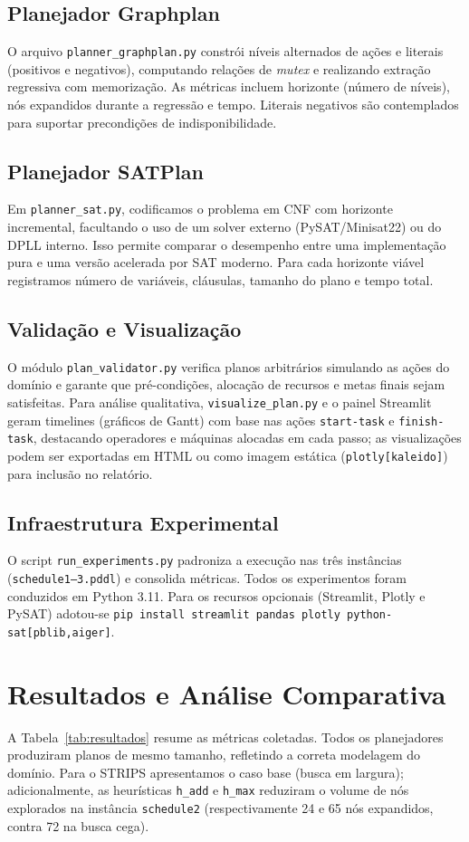 \documentclass[12pt]{article}
\begin{document}
\subsection{Planejador Graphplan}
O arquivo \texttt{planner\_graphplan.py} constrói níveis alternados de ações e literais (positivos e negativos), computando relações de \emph{mutex} e realizando extração regressiva com memorização. As métricas incluem horizonte (número de níveis), nós expandidos durante a regressão e tempo. Literais negativos são contemplados para suportar precondições de indisponibilidade.

\subsection{Planejador SATPlan}
Em \texttt{planner\_sat.py}, codificamos o problema em CNF com horizonte incremental, facultando o uso de um solver externo (PySAT/Minisat22) ou do DPLL interno. Isso permite comparar o desempenho entre uma implementação pura e uma versão acelerada por SAT moderno. Para cada horizonte viável registramos número de variáveis, cláusulas, tamanho do plano e tempo total.

\subsection{Validação e Visualização}
O módulo \texttt{plan\_validator.py} verifica planos arbitrários simulando as ações do domínio e garante que pré-condições, alocação de recursos e metas finais sejam satisfeitas. Para análise qualitativa, \texttt{visualize\_plan.py} e o painel Streamlit geram timelines (gráficos de Gantt) com base nas ações \texttt{start-task} e \texttt{finish-task}, destacando operadores e máquinas alocadas em cada passo; as visualizações podem ser exportadas em HTML ou como imagem estática (\texttt{plotly[kaleido]}) para inclusão no relatório.

\subsection{Infraestrutura Experimental}
O script \texttt{run\_experiments.py} padroniza a execução nas três instâncias (\texttt{schedule1--3.pddl}) e consolida métricas. Todos os experimentos foram conduzidos em Python 3.11. Para os recursos opcionais (Streamlit, Plotly e PySAT) adotou-se \texttt{pip install streamlit pandas plotly python-sat[pblib,aiger]}.

\section{Resultados e Análise Comparativa}
A Tabela~\ref{tab:resultados} resume as métricas coletadas. Todos os planejadores produziram planos de mesmo tamanho, refletindo a correta modelagem do domínio. Para o STRIPS apresentamos o caso base (busca em largura); adicionalmente, as heurísticas \texttt{h\_add} e \texttt{h\_max} reduziram o volume de nós explorados na instância \texttt{schedule2} (respectivamente 24 e 65 nós expandidos, contra 72 na busca cega).
\end{document}
